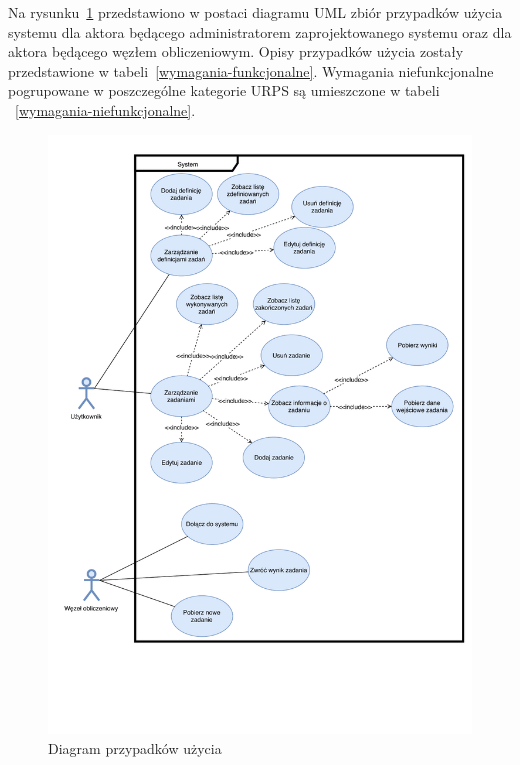 \documentclass[a4paper,11pt,twoside]{report}
\theoremstyle{definition}
\begin{document}
            Na rysunku~\ref{use-cases-diagram} przedstawiono w postaci diagramu UML zbiór przypadków użycia systemu dla aktora będącego administratorem zaprojektowanego systemu oraz dla aktora będącego węzłem obliczeniowym. Opisy przypadków użycia zostały przedstawione w tabeli~\ref{wymagania-funkcjonalne}. Wymagania niefunkcjonalne pogrupowane w poszczególne kategorie URPS są umieszczone w tabeli ~\ref{wymagania-niefunkcjonalne}.
            
            \begin{figure}
                \centering
                \caption{Diagram przypadków użycia}
                \label{use-cases-diagram}
                \includegraphics[width=\textwidth,height=\textheight,keepaspectratio]{images/use-cases.pdf}
            \end{figure}
        
\end{document}
